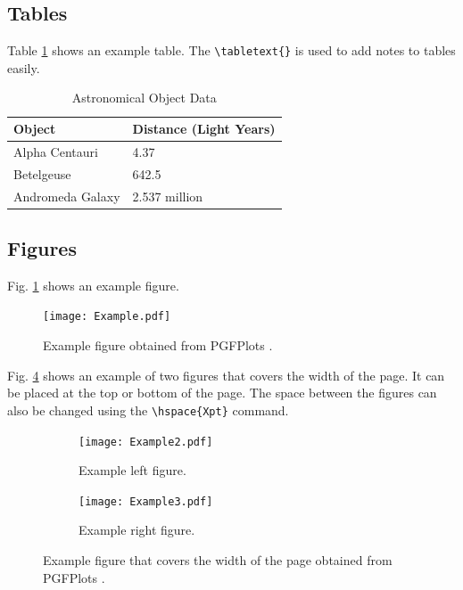 \documentclass[10pt,a4paper,twocolumn,twoside]{tau-class/tau}
\begin{document}
    \subsection{Tables}
	
        Table \ref{tab:table} shows an example table. The \verb|\tabletext{}| is used to add notes to tables easily. 
    		
        \begin{table}[H]
            \centering
            \caption{Astronomical Object Data}
            \label{tab:table}
            \begin{tabular}{ll}
                \toprule
                \textbf{Object} & \textbf{Distance (Light Years)} \\
                \midrule
                Alpha Centauri & 4.37 \\
                Betelgeuse & 642.5 \\
                Andromeda Galaxy & 2.537 million \\
                \bottomrule   
            \end{tabular}
			
			
        \end{table}

    \subsection{Figures}
		
    	Fig. \ref{fig:figure} shows an example figure.
    		
    	\begin{figure}[H]
    		\centering
    		\texttt{[image: Example.pdf]}
    		\caption{Example figure obtained from PGFPlots \cite{PFGPlots}.}
    		\label{fig:figure}
    	\end{figure}
		
        Fig. \ref{fig:examplefloat} shows an example of two figures that covers the width of the page. It can be placed at the top or bottom of the page. The space between the figures can also be changed using the \verb|\hspace{Xpt}| command.
		
        \begin{figure}[tp] %
		\centering
		  \begin{subfigure}[b]{0.38\linewidth} %
			\texttt{[image: Example2.pdf]}
			\caption{Example left figure.}
			\label{fig:figa}
		\end{subfigure}
			\hspace{20pt}   %
		\begin{subfigure}[b]{0.375\linewidth} %
			\texttt{[image: Example3.pdf]}
			\caption{Example right figure.}
			\label{fig:figb}
		\end{subfigure}
		\caption{Example figure that covers the width of the page obtained from PGFPlots \cite{PFGPlots}.}
		\label{fig:examplefloat}
	\end{figure}
		
\end{document}

